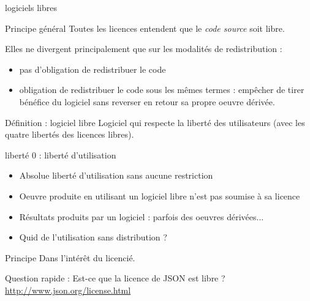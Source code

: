 \documentclass{beamer}
\begin{document}
\begin{frame}{logiciels libres}

  \begin{alertblock}{Principe général}
    Toutes les licences entendent que le \textit{code source} soit libre.
  \end{alertblock}
  Elles ne divergent principalement que sur les modalités de redistribution :
  \begin{itemize}
  \item pas d'obligation de redistribuer le code
  \item obligation de redistribuer le code sous les mêmes termes : empêcher de tirer bénéfice du logiciel sans reverser en retour sa propre oeuvre dérivée.
  \end{itemize}

  \begin{alertblock}{Définition : logiciel libre}
    Logiciel qui respecte la liberté des utilisateurs (avec les quatre libertés des licences libres).    
  \end{alertblock}
  
\end{frame}


\begin{frame}{liberté 0 : liberté d'utilisation}
  \begin{itemize}
  \item Absolue liberté d'utilisation sans aucune restriction
  \item Oeuvre produite en utilisant un logiciel libre n'est pas soumise à sa licence
  \item Résultats produits par un logiciel : parfois des oeuvres dérivées...
  \item Quid de l'utilisation sans distribution ?
  \end{itemize}

  \begin{alertblock}{Principe}
    Dans l'intérêt du licencié.
  \end{alertblock}
  
  Question rapide : Est-ce que la licence de JSON est libre ? \url{http://www.json.org/license.html}

\end{frame}
\end{document}
